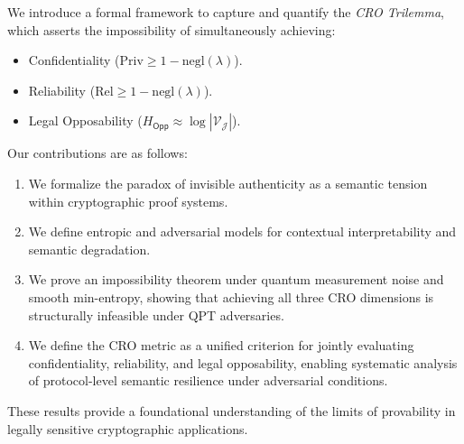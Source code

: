 \documentclass[preprint,12pt]{elsarticle}
\newcommand{\negl}{\mathrm{negl}}
\begin{document}
            We introduce a formal framework to capture and quantify the \emph{CRO Trilemma}, which asserts the impossibility of simultaneously achieving:
            \begin{itemize}
                \item Confidentiality ($\mathrm{Priv} \geq 1 - \negl(\lambda)$).
                \item Reliability ($\mathrm{Rel} \geq 1 - \negl(\lambda)$).
                \item Legal Opposability ($H_{\mathsf{Opp}} \approx \log |\mathcal{V}_\mathcal{J}|$).
            \end{itemize}

            Our contributions are as follows:
            \begin{enumerate}
                \item We formalize the paradox of invisible authenticity as a semantic tension within cryptographic proof systems.
                \item We define entropic and adversarial models for contextual interpretability and semantic degradation.
                \item We prove an impossibility theorem under quantum measurement noise and smooth min-entropy, showing that achieving all three CRO dimensions is structurally infeasible under QPT adversaries.
                \item We define the CRO metric as a unified criterion for jointly evaluating confidentiality, reliability, and legal opposability, enabling systematic analysis of protocol-level semantic resilience under adversarial conditions.
            \end{enumerate}

            These results provide a foundational understanding of the limits of provability in legally sensitive cryptographic applications.
\end{document}
